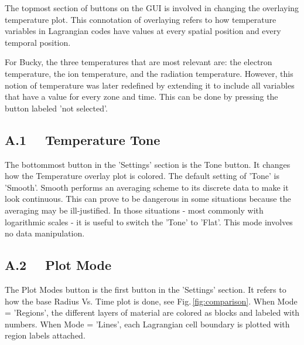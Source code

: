 The topmost section of buttons on the GUI is involved in changing the overlaying temperature plot.  This connotation of overlaying refers to how temperature variables in Lagrangian codes have values at every spatial position and every temporal position.  

For Bucky, the three temperatures that are most relevant are: the electron temperature, the ion temperature, and the radiation temperature.  However, this notion of temperature was later redefined by extending it to include all variables that have a value for every zone and time.  This can be done by pressing the button labeled 'not selected'.

\subsection{A.1 \ \ Temperature Tone }

The bottommost button in the 'Settings' section is the Tone button.  It changes how the Temperature overlay plot is colored.  The default setting of 'Tone' is 'Smooth'.  Smooth performs an averaging scheme to its discrete data to make it look continuous.  This can prove to be dangerous in some situations because the averaging may be ill-justified.  In those situations - most commonly with logarithmic scales - it is useful to switch the 'Tone' to 'Flat'.  This mode involves no data manipulation.  

\subsection{A.2 \ \ Plot Mode }

The Plot Modes button is the first button in the 'Settings' section.  It refers to how the base Radius Vs. Time plot is done, see Fig.\,\ref{fig:comparison}.  When Mode = 'Regions', the different layers of material are colored as blocks and labeled with numbers.  When Mode = 'Lines', each Lagrangian cell boundary is plotted with region labels attached.

